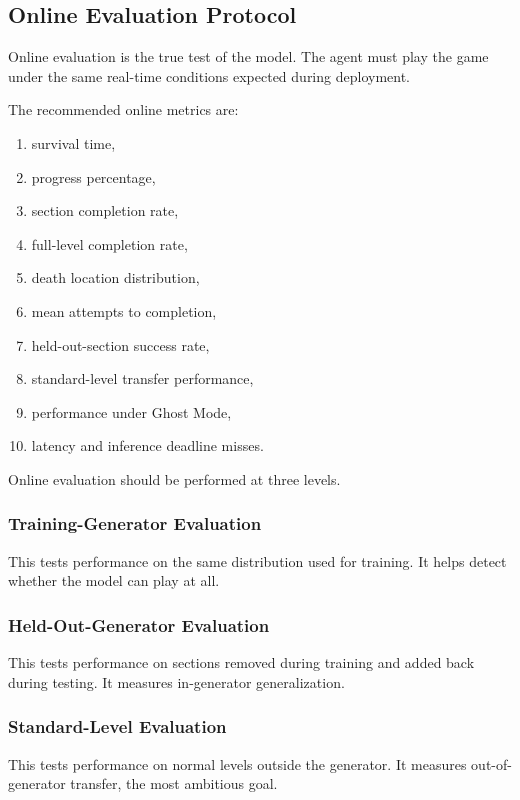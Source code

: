 \documentclass[11pt]{article}
\begin{document}
\subsection{Online Evaluation Protocol}

Online evaluation is the true test of the model. The agent must play the game under the same real-time conditions expected during deployment.

The recommended online metrics are:
\begin{enumerate}
  \item survival time,
  \item progress percentage,
  \item section completion rate,
  \item full-level completion rate,
  \item death location distribution,
  \item mean attempts to completion,
  \item held-out-section success rate,
  \item standard-level transfer performance,
  \item performance under Ghost Mode,
  \item latency and inference deadline misses.
\end{enumerate}

Online evaluation should be performed at three levels.

\subsubsection{Training-Generator Evaluation}

This tests performance on the same distribution used for training. It helps detect whether the model can play at all.

\subsubsection{Held-Out-Generator Evaluation}

This tests performance on sections removed during training and added back during testing. It measures in-generator generalization.

\subsubsection{Standard-Level Evaluation}

This tests performance on normal levels outside the generator. It measures out-of-generator transfer, the most ambitious goal.
\end{document}
